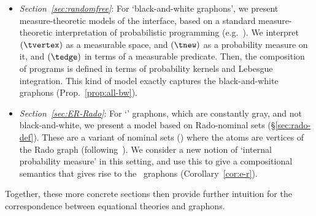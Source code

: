 \begin{itemize}
\item \emph{Section~\ref{sec:randomfree}}: For `black-and-white graphons', we present 
  measure-theoretic models of the interface, based on a standard
  measure-theoretic interpretation of probabilistic programming
  (e.g.~\cite{Kozen81}).
  We interpret $(\tvertex)$ as a measurable space, and $(\tnew)$ as a
  probability measure on it, and $(\tedge)$ in terms of a measurable predicate. 
  Then, the composition of programs is defined in terms of probability
  kernels and Lebesgue integration.
  This kind of model exactly captures the black-and-white graphons (Prop.~\ref{prop:all-bw}).
\item \emph{Section~\ref{sec:ER-Rado}}: For `\ErdosRenyi' graphons, which are
  constantly gray, and not
  black-and-white, we present a model based on Rado-nominal sets (\S\ref{sec:rado-def}).
  These are a variant of nominal sets (\cite{gp-nominal,pitts-nom-book}) %
  where the atoms are vertices of
  the Rado graph (following~\cite{lmcs:1157}). We consider a new notion of `internal
  probability measure' in this setting, and use this to give a 
  compositional semantics that gives rise to the \ErdosRenyi\
  graphons (Corollary~\ref{cor:e-r}).
\end{itemize}
Together, these more concrete sections then provide further intuition for the
correspondence between equational theories and graphons. 

